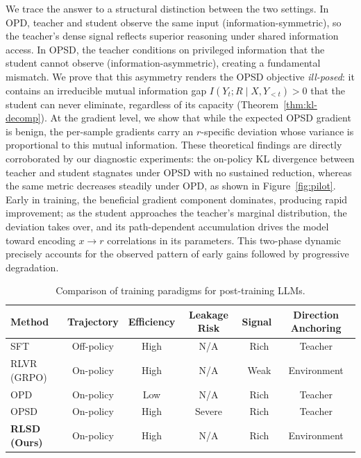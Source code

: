\documentclass[]{jingdong}
\newcommand{\cmark}{\textcolor{green!70!black}{\ding{51}}}
\newcommand{\xmark}{\textcolor{red}{\ding{55}}}
\begin{document}
We trace the answer to a structural distinction between the two settings. In OPD, teacher and student observe the same input (information-symmetric), so the teacher's dense signal reflects superior reasoning under shared information access. In OPSD, the teacher conditions on privileged information that the student cannot observe (information-asymmetric), creating a fundamental mismatch. We prove that this asymmetry renders the OPSD objective \textit{ill-posed}: it contains an irreducible mutual information gap $I(Y_t; R \mid X, Y_{<t}) > 0$ that the student can never eliminate, regardless of its capacity (Theorem~\ref{thm:kl-decomp}). At the gradient level, we show that while the expected OPSD gradient is benign, the per-sample gradients carry an $r$-specific deviation whose variance is proportional to this mutual information. These theoretical findings are directly corroborated by our diagnostic experiments: the on-policy KL divergence between teacher and student stagnates under OPSD with no sustained reduction, whereas the same metric decreases steadily under OPD, as shown in Figure~\ref{fig:pilot}. Early in training, the beneficial gradient component dominates, producing rapid improvement; as the student approaches the teacher's marginal distribution, the deviation takes over, and its path-dependent accumulation drives the model toward encoding $x \to r$ correlations in its parameters. This two-phase dynamic precisely accounts for the observed pattern of early gains followed by progressive degradation. 



\begin{table}[!t]
\centering
\caption{Comparison of training paradigms for post-training LLMs.}
\vspace{0.1cm}
\label{tab:unified}
\small
\begin{tabular}{lccccc}
\toprule
\textbf{Method} & \textbf{Trajectory} & \textbf{Efficiency}  & \textbf{Leakage Risk} & \textbf{Signal} & \textbf{Direction Anchoring} \\
\midrule
SFT & \xmark Off-policy &  \cmark High  & \cmark N/A & \cmark \ Rich & \xmark Teacher \\
RLVR (GRPO) & \cmark On-policy &  \cmark High  & \cmark N/A & \xmark \ Weak & \cmark Environment  \\
OPD & \cmark On-policy & \xmark Low  &  \cmark N/A & \cmark \ Rich & \xmark Teacher \\
OPSD & \cmark On-policy & \cmark High & \xmark Severe & \cmark \ Rich & \xmark Teacher \\
\textbf{RLSD (Ours)} & \cmark On-policy & \cmark High & \cmark N/A & \cmark \ Rich & \cmark Environment \\
\bottomrule
\end{tabular}
\end{table}
\end{document}
